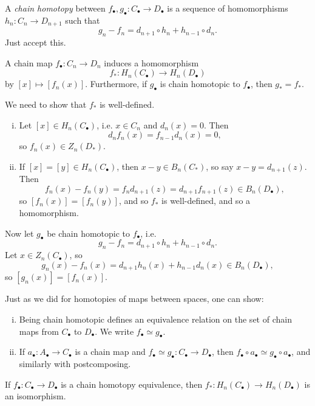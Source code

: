 \documentclass[12pt]{article}
\begin{document}
A \emph{chain homotopy} between $f_\bullet, g_\bullet : C_\bullet \to D_\bullet$ is a sequence of homomorphisms $h_n : C_n \to D_{n+1}$ such that
\[
g_n - f_n = d_{n+1} \circ h_n + h_{n-1} \circ d_n.
\]
Just accept this.

\begin{lemma}
	A chain map $f_\bullet : C_n \to D_n$ induces a homomorphism
	\[
	f_\ast : H_n(C_\bullet) \to H_n(D_\bullet)
	\]
	by $[x] \mapsto [f_n(x)]$. Furthermore, if $g_\bullet$ is chain homotopic to $f_\bullet$, then $g_\ast = f_\ast$.
\end{lemma}

\begin{proofbox}
	We need to show that $f_\ast$ is well-defined.
	\begin{enumerate}[(i)]
		\item Let $[x] \in H_n(C_\bullet)$, i.e. $x \in C_n$ and $d_n(x) =0$. Then
			\[
				d_n f_n (x) = f_{n-1} d_n(x) = 0,
			\]
			so $f_n (x) \in Z_n(D_\ast)$.
		\item If $[x] = [y] \in H_n(C_\bullet)$, then $x - y \in B_n(C_\ast)$, so say $x  - y = d_{n+1}(z)$. Then
			\[
			f_n(x) - f_n(y) = f_n d_{n+1}(z) = d_{n+1}f_{n+1}(z) \in B_n(D_\bullet),
			\]
			so $[f_n(x)] = [f_n(y)]$, and so $f_\ast$ is well-defined, and so a homomorphism.
	\end{enumerate}
	Now let $g_\bullet$ be chain homotopic to $f_\bullet$, i.e.
	\[
	g_n - f_n = d_{n+1} \circ h_n + h_{n-1} \circ d_n.
	\]
	Let $x \in Z_n(C_\bullet)$, so
	\[
	g_n(x) - f_n(x) = d_{n+1} h_n(x) + h_{n-1}d_n(x) \in B_n(D_\bullet),
	\]
	so $[g_n(x)] = [f_n(x)]$.
\end{proofbox}


Just as we did for homotopies of maps between spaces, one can show:
\begin{enumerate}[(i)]
	\item Being chain homotopic defines an equivalence relation on the set of chain maps from $C_\bullet$ to $D_\bullet$. We write $f_\bullet \simeq g_\bullet$.
	\item If $a_\bullet : A_\bullet \to C_\bullet$ is a chain map and $f_\bullet \simeq g_\bullet : C_\bullet \to D_\bullet$, then $f_\bullet \circ a_\bullet \simeq g_\bullet \circ a_\bullet$, and similarly with postcomposing.
\end{enumerate}

\begin{lemma}
	If $f_\bullet : C_\bullet \to D_\bullet$ is a chain homotopy equivalence, then $f_\ast : H_n(C_\bullet) \to H_n(D_\bullet)$ is an isomorphism.
\end{lemma}
\end{document}
